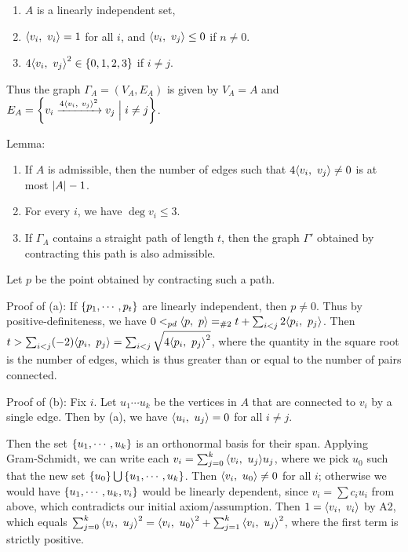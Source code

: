 \begin{enumerate}
\def\labelenumi{\arabic{enumi}.}
\tightlist
\item
  \(A\) is a linearly independent set,
\item
  \({\left\langle {v_i},~{v_i} \right\rangle} = 1\) for all \(i\), and
  \({\left\langle {v_i},~{v_j} \right\rangle} \leq 0\) if \(n\neq 0\).
\item
  \(4{\left\langle {v_i},~{v_j} \right\rangle}^2 \in \left\{{0,1,2,3}\right\}\) if \(i\neq j\).
\end{enumerate}

Thus the graph \(\Gamma_A = (V_A, E_A)\) is given by \(V_A = A\) and
\(E_A = \left\{{v_i \xrightarrow{4{\left\langle {v_i},~{v_j} \right\rangle}^2} v_j \mathrel{\Big|} i\neq j}\right\}\).

Lemma:

\begin{enumerate}
\def\labelenumi{\alph{enumi}.}
\tightlist
\item
  If \(A\) is admissible, then the number of edges such that
  \(4{\left\langle {v_i},~{v_j} \right\rangle} \neq 0\) is at most \({\left\lvert {A} \right\rvert} - 1\).
\item
  For every \(i\), we have \(\deg v_i \leq 3\).
\item
  If \(\Gamma_A\) contains a straight path of length \(t\), then the
  graph \(\Gamma'\) obtained by contracting this path is also
  admissible.
\end{enumerate}

Let \(p\) be the point obtained by contracting such a path.

Proof of (a): If \(\left\{{p_1, \cdots, p_t}\right\}\) are linearly independent,
then \(p\neq 0\). Thus by positive-definiteness, we have
\(0 <_{pd} {\left\langle {p},~{p} \right\rangle} =_{\# 2} t + \sum_{i < j} 2{\left\langle {p_i},~{p_j} \right\rangle}\).
Then
\(t > \sum_{i < j} (-2) {\left\langle {p_i},~{p_j} \right\rangle} = \sum_{i < j} \sqrt{4{\left\langle {p_i},~{p_j} \right\rangle}^2}\),
where the quantity in the square root is the number of edges, which is
thus greater than or equal to the number of pairs connected.

Proof of (b): Fix \(i\). Let \(u_1 \cdots u_k\) be the vertices in \(A\)
that are connected to \(v_i\) by a single edge. Then by (a), we have
\({\left\langle {u_i},~{u_j} \right\rangle} = 0\) for all \(i\neq j\).

Then the set \(\left\{{u_1, \cdots, u_k}\right\}\) is an orthonormal basis for
their span. Applying Gram-Schmidt, we can write each
\(v_i = \sum_{j=0}^k {\left\langle {v_i},~{u_j} \right\rangle} u_j\), where we pick \(u_0\) such
that the new set \(\left\{{u_0}\right\} \bigcup \left\{{u_1, \cdots, u_k}\right\}\). Then
\({\left\langle {v_i},~{u_0} \right\rangle} \neq 0\) for all \(i\); otherwise we would have
\(\left\{{u_1, \cdots, u_k, v_i}\right\}\) would be linearly dependent, since
\(v_i = \sum c_i u_i\) from above, which contradicts our initial
axiom/assumption. Then \(1 = {\left\langle {v_i},~{v_i} \right\rangle}\) by A2, which equals
\(\sum_{j=0}^k {\left\langle {v_i},~{u_j} \right\rangle}^2 = {\left\langle {v_i},~{u_0} \right\rangle}^2 + \sum_{j=1}^k {\left\langle {v_i},~{u_j} \right\rangle}^2\),
where the first term is strictly positive.

